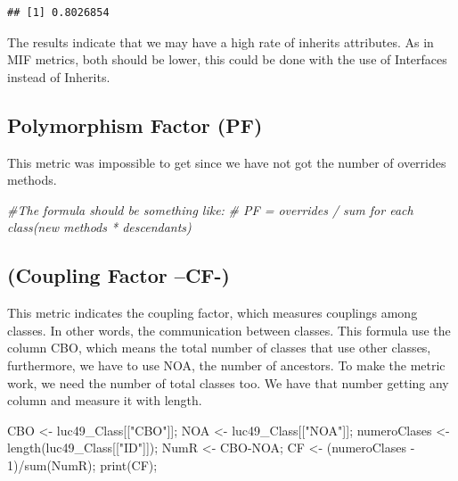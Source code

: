 \documentclass[
]{article}
\newenvironment{Shaded}{\begin{snugshade}}{\end{snugshade}}
\newcommand{\CommentTok}[1]{\textcolor[rgb]{0.56,0.35,0.01}{\textit{#1}}}
\newcommand{\DecValTok}[1]{\textcolor[rgb]{0.00,0.00,0.81}{#1}}
\newcommand{\FunctionTok}[1]{\textcolor[rgb]{0.00,0.00,0.00}{#1}}
\newcommand{\NormalTok}[1]{#1}
\newcommand{\OtherTok}[1]{\textcolor[rgb]{0.56,0.35,0.01}{#1}}
\newcommand{\SpecialCharTok}[1]{\textcolor[rgb]{0.00,0.00,0.00}{#1}}
\newcommand{\StringTok}[1]{\textcolor[rgb]{0.31,0.60,0.02}{#1}}
\begin{document}
\begin{verbatim}
## [1] 0.8026854
\end{verbatim}

The results indicate that we may have a high rate of inherits
attributes. As in MIF metrics, both should be lower, this could be done
with the use of Interfaces instead of Inherits.

\hypertarget{polymorphism-factor-pf}{%
\subsection{Polymorphism Factor (PF)}\label{polymorphism-factor-pf}}

This metric was impossible to get since we have not got the number of
overrides methods.

\begin{Shaded}
\begin{Highlighting}[]
\CommentTok{\#The formula should be something like:}
\CommentTok{\# PF = overrides / sum for each class(new methods * descendants)}
\end{Highlighting}
\end{Shaded}

\hypertarget{coupling-factor-cf-}{%
\subsection{(Coupling Factor --CF-)}\label{coupling-factor-cf-}}

This metric indicates the coupling factor, which measures couplings
among classes. In other words, the communication between classes. This
formula use the column CBO, which means the total number of classes that
use other classes, furthermore, we have to use NOA, the number of
ancestors. To make the metric work, we need the number of total classes
too. We have that number getting any column and measure it with length.

\begin{Shaded}
\begin{Highlighting}[]
\NormalTok{CBO }\OtherTok{\textless{}{-}}\NormalTok{ luc49\_Class[[}\StringTok{"CBO"}\NormalTok{]];}
\NormalTok{NOA }\OtherTok{\textless{}{-}}\NormalTok{ luc49\_Class[[}\StringTok{"NOA"}\NormalTok{]];}
\NormalTok{numeroClases }\OtherTok{\textless{}{-}} \FunctionTok{length}\NormalTok{(luc49\_Class[[}\StringTok{"ID"}\NormalTok{]]);}
\NormalTok{NumR }\OtherTok{\textless{}{-}}\NormalTok{ CBO}\SpecialCharTok{{-}}\NormalTok{NOA;}
\NormalTok{CF }\OtherTok{\textless{}{-}}\NormalTok{ (numeroClases }\SpecialCharTok{{-}} \DecValTok{1}\NormalTok{)}\SpecialCharTok{/}\FunctionTok{sum}\NormalTok{(NumR);}
\FunctionTok{print}\NormalTok{(CF);}
\end{Highlighting}
\end{Shaded}
\end{document}

